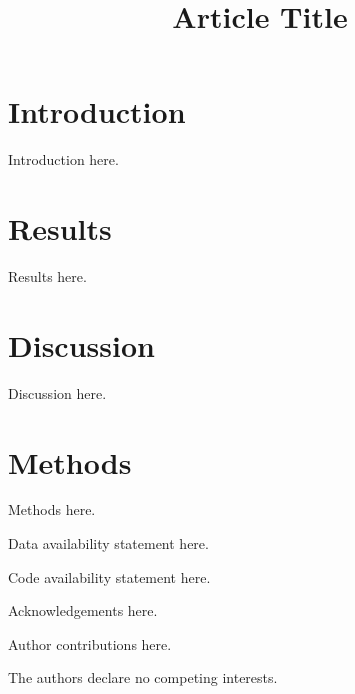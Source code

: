 \documentclass[pdflatex,sn-nature,lineno,referee]{sn-jnl}%
\begin{document}
\title[Short Title]{Article Title}

\author*[1]{ }


\maketitle

\section{Introduction}\label{sec:intro}
Introduction here.

\section{Results}\label{sec:results}
Results here.

\section{Discussion}\label{sec:discussion}
Discussion here.

\section{Methods}\label{sec:methods}
Methods here.

\backmatter

Data availability statement here.

Code availability statement here.

Acknowledgements here.

Author contributions here.

The authors declare no competing interests.


\end{document}
